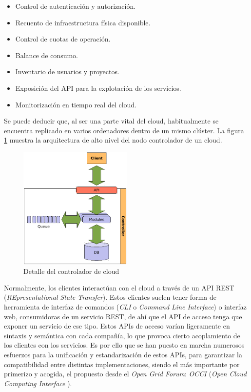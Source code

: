 \begin{itemize}
 \item Control de autenticaci\'on y autorizaci\'on.
 \item Recuento de infraestructura f\'isica disponible.
 \item Control de cuotas de operaci\'on.
 \item Balance de consumo.
 \item Inventario de usuarios y proyectos.
 \item Exposici\'on del API para la explotaci\'on de los servicios.
 \item Monitorizaci\'on en tiempo real del cloud.
\end{itemize}
 
Se puede deducir que, al ser una parte vital del cloud, habitualmente se encuentra replicado en varios ordenadores dentro de un mismo cl\'uster. La figura \ref{fig:cloudcontroller} muestra la arquitectura de alto nivel del nodo controlador de un cloud.\newline

\begin{figure}[tbp]
\begin{center}
\includegraphics[width=0.5\textwidth]{imagenes/005.pdf}
 \caption{Detalle del controlador de cloud}
\label{fig:cloudcontroller}
\end{center}
\end{figure}

Normalmente, los clientes interact\'uan con el cloud a trav\'es de un API REST (\emph{REpresentational State Transfer}). Estos clientes suelen tener forma de herramienta de interfaz de comandos (\emph{CLI} o \emph{Command Line Interface}) o interfaz web, consumidoras de un servicio REST, de ah\'i que el API de acceso tenga que exponer un servicio de ese tipo. Estos APIs de acceso var\'ian li\-ge\-ra\-men\-te en sintaxis y sem\'antica con cada compa\~n\'ia, lo que provoca cierto acoplamiento de los clientes con los servicios. Es por ello que se han puesto en marcha numerosos esfuerzos para la unificaci\'on y estandarizaci\'on de estos APIs, para garantizar la compatibilidad entre distintas implementaciones, siendo el m\'as importante por primerizo y acogida, el propuesto desde el \emph{Open Grid Forum}: \emph{OCCI} (\emph{Open Cloud Computing Interface} \cite{occisdraft}).\newline

